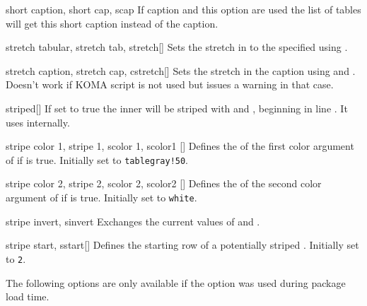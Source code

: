 \begin{describeopt}{short caption, short cap, scap}%
  If caption and this option are used the list of tables will get this short
  caption instead of the caption.
\end{describeopt}%
\begin{describeopt}{stretch tabular, stretch tab, stretch}[]%
  Sets the stretch in  to the specified  using
  .
\end{describeopt}%
\begin{describeopt}{stretch caption, stretch cap, cstretch}[]%
  Sets the stretch in the caption using  and .
  Doesn't work if KOMA script is not used but issues a warning in that case.
\end{describeopt}%
\begin{describeopt}{striped}[]%
  If set to true the inner  will be striped with  and , beginning in line . It
  uses  internally.
\end{describeopt}%
\begin{describeopt}{stripe color 1, stripe 1, scolor 1, scolor1}%
  []
  Defines the  of the first color argument of  if
   is true. Initially set to \texttt{tablegray!50}.
\end{describeopt}%
\begin{describeopt}{stripe color 2, stripe 2, scolor 2, scolor2}%
  []
  Defines the  of the second color argument of  if
   is true. Initially set to \texttt{white}.
\end{describeopt}%
\begin{describeopt}{stripe invert, sinvert}%
  Exchanges the current values of  and .
\end{describeopt}%
\begin{describeopt}{stripe start, sstart}[]%
  Defines the starting row of a potentially striped . Initially
  set to \texttt{2}.
\end{describeopt}%

The following options are only available if the  option was used
during package load time.

